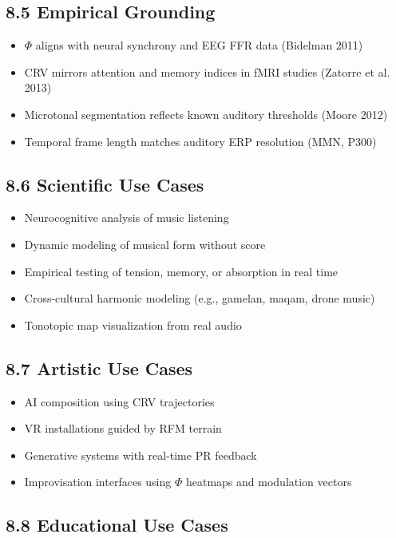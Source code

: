 \documentclass[10pt]{article}
\begin{document}
\subsection*{8.5 Empirical Grounding}

\begin{itemize}
    \item $\Phi$ aligns with neural synchrony and EEG FFR data (Bidelman 2011)
    \item CRV mirrors attention and memory indices in fMRI studies (Zatorre et al. 2013)
    \item Microtonal segmentation reflects known auditory thresholds (Moore 2012)
    \item Temporal frame length matches auditory ERP resolution (MMN, P300)
\end{itemize}

\subsection*{8.6 Scientific Use Cases}

\begin{itemize}
    \item Neurocognitive analysis of music listening
    \item Dynamic modeling of musical form without score
    \item Empirical testing of tension, memory, or absorption in real time
    \item Cross-cultural harmonic modeling (e.g., gamelan, maqam, drone music)
    \item Tonotopic map visualization from real audio
\end{itemize}

\subsection*{8.7 Artistic Use Cases}

\begin{itemize}
    \item AI composition using CRV trajectories
    \item VR installations guided by RFM terrain
    \item Generative systems with real-time PR feedback
    \item Improvisation interfaces using $\Phi$ heatmaps and modulation vectors
\end{itemize}

\subsection*{8.8 Educational Use Cases}
\end{document}
